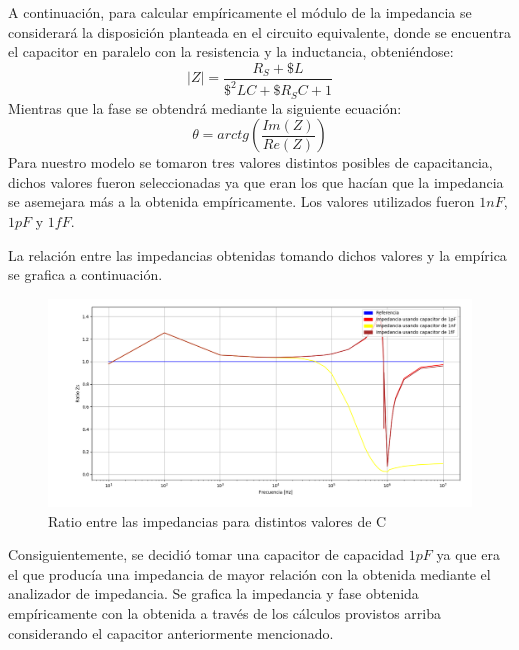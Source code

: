 A continuación, para calcular empíricamente el módulo de la impedancia se considerará la disposición planteada en el circuito equivalente, donde se encuentra el capacitor en paralelo con la resistencia y la inductancia, obteniéndose: 
\begin{equation}
|Z|= \frac{R_S+\$L}{\$^2LC+\$R_SC+1}
\end{equation}
Mientras que la fase se obtendrá mediante la siguiente ecuación:
\begin{equation}
\theta= arctg\left(\frac{Im(Z)}{Re(Z)}\right)
\end{equation}
Para nuestro modelo se tomaron tres valores distintos posibles de capacitancia, dichos valores fueron seleccionadas ya que eran los que hacían que la impedancia se asemejara más a la obtenida empíricamente. Los valores utilizados fueron $1nF$, $1pF$ y $1fF$.

La relación entre las impedancias obtenidas tomando dichos valores y la empírica se grafica a continuación.

\begin{figure}[H]
\centering
\includegraphics[width=1\textwidth]{Ejercicio_1(Germo)/Grafico/relacionZs.png}
\caption{Ratio entre las impedancias para distintos valores de C}
\label{fig:relacionZs}
\end{figure}


Consiguientemente, se decidió tomar una capacitor de capacidad $1pF$ ya que era el que producía una impedancia de mayor relación con la obtenida mediante el analizador de impedancia. Se grafica la impedancia y fase obtenida empíricamente con la obtenida a través de los cálculos provistos arriba considerando el capacitor anteriormente mencionado.


